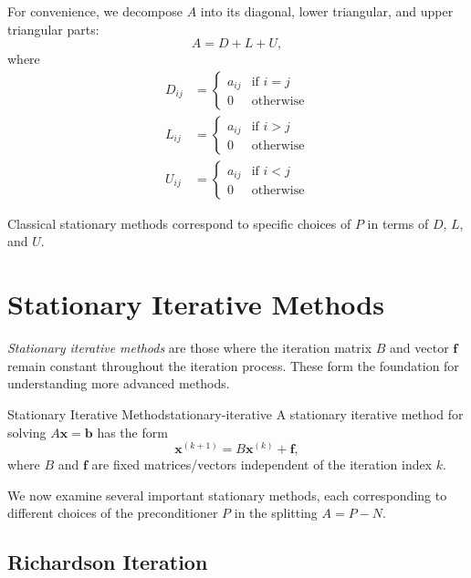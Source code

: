 For convenience, we decompose $A$ into its diagonal, lower triangular, and upper triangular parts:
\begin{equation}
    A = D + L + U,
\end{equation}
where
\begin{align}
    D_{ij} &= \begin{cases} a_{ij} & \text{if } i = j \\ 0 & \text{otherwise} \end{cases} \\
    L_{ij} &= \begin{cases} a_{ij} & \text{if } i > j \\ 0 & \text{otherwise} \end{cases} \\
    U_{ij} &= \begin{cases} a_{ij} & \text{if } i < j \\ 0 & \text{otherwise} \end{cases}
\end{align}

Classical stationary methods correspond to specific choices of $P$ in terms of $D$, $L$, and $U$.


\section{Stationary Iterative Methods}

\emph{Stationary iterative methods} are those where the iteration matrix $B$ and vector $\mathbf{f}$ remain constant throughout the iteration process. These form the foundation for understanding more advanced methods.

\begin{definition}{Stationary Iterative Method}{stationary-iterative}
    A stationary iterative method for solving $A\mathbf{x} = \mathbf{b}$ has the form
    \begin{equation}
        \mathbf{x}^{(k+1)} = B\mathbf{x}^{(k)} + \mathbf{f},
        \label{eq:stationary-iterative}
    \end{equation}
    where $B$ and $\mathbf{f}$ are fixed matrices/vectors independent of the iteration index $k$.
\end{definition}

We now examine several important stationary methods, each corresponding to different choices of the preconditioner $P$ in the splitting $A = P - N$.

\subsection{Richardson Iteration}

